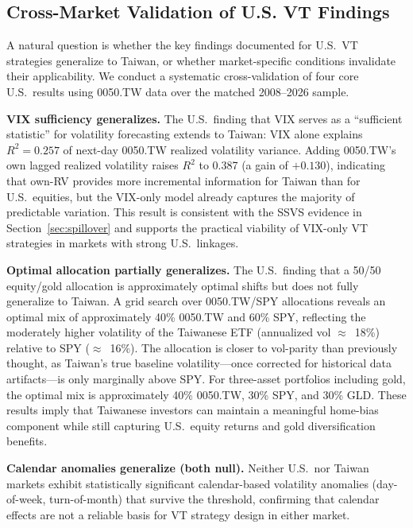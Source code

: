\subsection{Cross-Market Validation of U.S. VT Findings}
\label{sec:cross_validation}

A natural question is whether the key findings documented for U.S.\ VT strategies generalize to Taiwan, or whether market-specific conditions invalidate their applicability. We conduct a systematic cross-validation of four core U.S.\ results using 0050.TW data over the matched 2008--2026 sample.

\textbf{VIX sufficiency generalizes.} The U.S.\ finding that VIX serves as a ``sufficient statistic'' for volatility forecasting extends to Taiwan: VIX alone explains $R^2 = 0.257$ of next-day 0050.TW realized volatility variance. Adding 0050.TW's own lagged realized volatility raises $R^2$ to 0.387 (a gain of $+0.130$), indicating that own-RV provides more incremental information for Taiwan than for U.S.\ equities, but the VIX-only model already captures the majority of predictable variation. This result is consistent with the SSVS evidence in Section~\ref{sec:spillover} and supports the practical viability of VIX-only VT strategies in markets with strong U.S.\ linkages.

\textbf{Optimal allocation partially generalizes.} The U.S.\ finding that a 50/50 equity/gold allocation is approximately optimal shifts but does not fully generalize to Taiwan. A grid search over 0050.TW/SPY allocations reveals an optimal mix of approximately 40\% 0050.TW and 60\% SPY, reflecting the moderately higher volatility of the Taiwanese ETF (annualized vol $\approx$~18\%) relative to SPY ($\approx$~16\%). The allocation is closer to vol-parity than previously thought, as Taiwan's true baseline volatility---once corrected for historical data artifacts---is only marginally above SPY. For three-asset portfolios including gold, the optimal mix is approximately 40\% 0050.TW, 30\% SPY, and 30\% GLD. These results imply that Taiwanese investors can maintain a meaningful home-bias component while still capturing U.S.\ equity returns and gold diversification benefits.

\textbf{Calendar anomalies generalize (both null).} Neither U.S.\ nor Taiwan markets exhibit statistically significant calendar-based volatility anomalies (day-of-week, turn-of-month) that survive the \citet{harvey2016} threshold, confirming that calendar effects are not a reliable basis for VT strategy design in either market.

